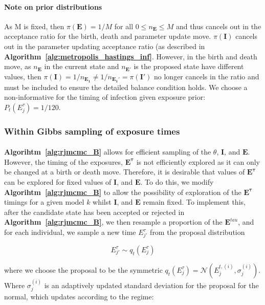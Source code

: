 \paragraph{Note on prior distributions}As M is fixed, then $\pi(\mathbf{E}) = 1/M$ for all $0 \leq n_{\mathbf{E}} \leq M$ and thus cancels out in the acceptance ratio for the birth, death and parameter update move. $\pi(\mathbf{I})$ cancels out in the parameter updating acceptance ratio (as described in \textbf{Algorithm~\ref{alg:metropolis_hastings_inf}}. However, in the birth and death move, as $n_{\mathbf{E}}$ in the current state and $n_{\mathbf{E}'}$ is the proposed state have different values, then $\pi(\mathbf{I}) = 1/n_\mathbf{E_1} \neq  1/n_\mathbf{E_1'} = \pi(\mathbf{I}')$ no longer cancels in the ratio and must be included to ensure the detailed balance condition holds. 
We choose a non-informative for the timing of infection given exposure prior: $P_t(E_j^\tau) = 1 / 120$.

\subsubsection{Within Gibbs sampling of exposure times}

\paragraph{}\textbf{Algorihtm~\ref{alg:rjmcmc_B}} allows for efficient sampling of the $\theta$, $\mathbf{I}$, and $\mathbf{E}$. However, the timing of the exposures, $\mathbf{E^\tau}$ is not efficiently explored as it can only be changed at a birth or death move. Therefore, it is desirable that values of $\mathbf{E^\tau}$ can be explored for fixed values of $\mathbf{I}$, and $\mathbf{E}$. To do this, we modify \textbf{Algorihtm~\ref{alg:rjmcmc_B}} to allow the possibility of exploration of the $\mathbf{E^\tau}$ timings for a given model $k$ whilst $\mathbf{I}$, and $\mathbf{E}$ remain fixed. To implement this, after the candidate state has been accepted or rejected in \textbf{Algorithm~\ref{alg:rjmcmc_B}}, we then resample a proportion of the $\mathbf{E}^{tau}$, and for each individual, we sample a new time $E_{j'}^\tau$ from the proposal distribution

$$E_{j'}^{\tau} \sim q_t(E_{j}^{\tau}) $$

where we choose the proposal to be the symmetric $q_t(E_{j}^{\tau}) = \mathcal{N}(E_j^{t, (i)}, \sigma^{(i)}_j)$.  Where $\sigma^{(i)}_j$ is an adaptively updated standard deviation for the proposal for the normal, which updates according to the regime:

